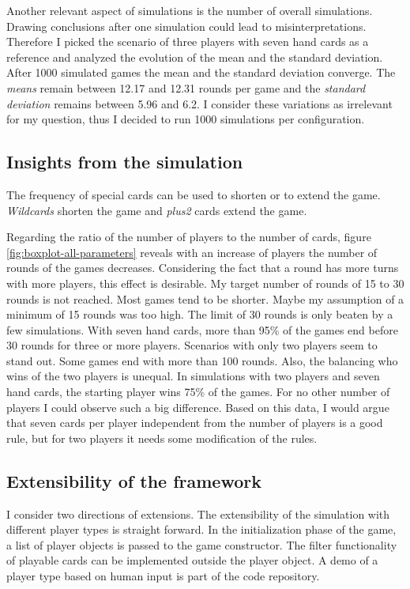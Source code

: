 Another relevant aspect of simulations is the number of overall simulations. Drawing conclusions after one simulation could lead to misinterpretations. Therefore I picked the scenario of three players with seven hand cards as a reference and analyzed the evolution of the mean and the standard deviation. After 1000 simulated games the mean and the standard deviation converge. The \textit{means} remain between 12.17 and 12.31 rounds per game and the \textit{standard deviation} remains between 5.96 and 6.2. I consider these variations as irrelevant for my question, thus I decided to run 1000 simulations per configuration.


\subsection{Insights from the simulation}

The frequency of special cards can be used to shorten or to extend the game. \textit{Wildcards} shorten the game and \textit{plus2} cards extend the game.

Regarding the ratio of the number of players to the number of cards, figure \ref{fig:boxplot-all-parameters} reveals with an increase of players the number of rounds of the games decreases. Considering the fact that a round has more turns with more players, this effect is desirable. My target number of rounds of 15 to 30 rounds is not reached. Most games tend to be shorter. Maybe my assumption of a minimum of 15 rounds was too high. The limit of 30 rounds is only beaten by a few simulations. With seven hand cards, more than 95\% of the games end before 30 rounds for three or more players.
Scenarios with only two players seem to stand out. Some games end with more than 100 rounds. Also, the balancing who wins of the two players is unequal. In simulations with two players and seven hand cards, the starting player wins 75\% of the games. For no other number of players I could observe such a big difference.
Based on this data, I would argue that seven cards per player independent from the number of players is a good rule, but for two players it needs some modification of the rules.

\subsection{Extensibility of the framework}

I consider two directions of extensions.
The extensibility of the simulation with different player types is straight forward. In the initialization phase of the game, a list of player objects is passed to the game constructor. The filter functionality of playable cards can be implemented outside the player object. A demo of a player type based on human input is part of the code repository.



